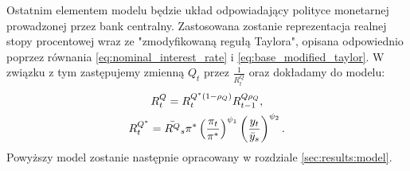 Ostatnim elementem modelu będzie układ odpowiadający polityce monetarnej prowadzonej przez bank centralny. Zastosowana zostanie reprezentacja realnej stopy procentowej wraz ze "zmodyfikowaną regułą Taylora", opisana odpowiednio poprzez równania \eqref{eq:nominal_interest_rate} i \eqref{eq:base_modified_taylor}. W związku z tym zastępujemy zmienną $Q_t$ przez $\frac{1}{R^Q_t}$ oraz dokładamy do modelu:
\begin{gather}
    R^Q_t = R_t^{Q^*(1-\rho_Q)}R_{t-1}^{Q\rho_Q}, \\
    R^{Q^*}_t = \bar{R^Q}_s \pi^* \left( \frac{\pi_t}{\pi^*}\right)^{\psi_1} \left(\frac{y_t}{\bar{y}_s}\right)^{\psi_2}.
\end{gather}
Powyższy model zostanie następnie opracowany w rozdziale \ref{sec:results:model}.
 